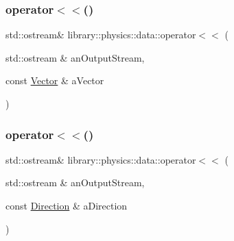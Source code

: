 \subsubsection{\texorpdfstring{operator$<$$<$()}{operator<<()}\hspace{0.1cm}{\footnotesize\ttfamily [2/3]}}
{\footnotesize\ttfamily std\+::ostream\& library\+::physics\+::data\+::operator$<$$<$ (\begin{DoxyParamCaption}\item[{std\+::ostream \&}]{an\+Output\+Stream,  }\item[{const \hyperlink{classlibrary_1_1physics_1_1data_1_1_vector}{Vector} \&}]{a\+Vector }\end{DoxyParamCaption})}

\mbox{\label{namespacelibrary_1_1physics_1_1data_ab8943251539d57e6cfc3c11d2d89b5e0}} 
\subsubsection{\texorpdfstring{operator$<$$<$()}{operator<<()}\hspace{0.1cm}{\footnotesize\ttfamily [3/3]}}
{\footnotesize\ttfamily std\+::ostream\& library\+::physics\+::data\+::operator$<$$<$ (\begin{DoxyParamCaption}\item[{std\+::ostream \&}]{an\+Output\+Stream,  }\item[{const \hyperlink{classlibrary_1_1physics_1_1data_1_1_direction}{Direction} \&}]{a\+Direction }\end{DoxyParamCaption})}

